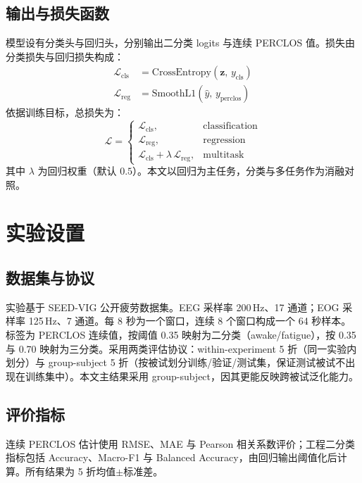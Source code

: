 \documentclass[11pt,a4paper]{ctexart}
\begin{document}
\subsection{输出与损失函数}
模型设有分类头与回归头，分别输出二分类 logits 与连续 PERCLOS 值。损失由分类损失与回归损失构成：
\begin{align}
\mathcal{L}_{\text{cls}} &= \mathrm{CrossEntropy}(\mathbf{z},\,y_{\text{cls}}) \label{eq:lcls}\\
\mathcal{L}_{\text{reg}} &= \mathrm{SmoothL1}(\hat{y},\,y_{\text{perclos}}) \label{eq:lreg}
\end{align}
依据训练目标，总损失为：
\begin{equation}
\mathcal{L} = \begin{cases}
\mathcal{L}_{\text{cls}}, & \text{classification} \\[2pt]
\mathcal{L}_{\text{reg}}, & \text{regression} \\[2pt]
\mathcal{L}_{\text{cls}} + \lambda\,\mathcal{L}_{\text{reg}}, & \text{multitask}
\end{cases}
\label{eq:loss}
\end{equation}
其中 $\lambda$ 为回归权重（默认 $0.5$）。本文以回归为主任务，分类与多任务作为消融对照。

\section{实验设置}

\subsection{数据集与协议}
实验基于 SEED-VIG 公开疲劳数据集。EEG 采样率 200\,Hz、17 通道；EOG 采样率 125\,Hz、7 通道。每 8 秒为一个窗口，连续 8 个窗口构成一个 64 秒样本。标签为 PERCLOS 连续值，按阈值 0.35 映射为二分类（awake/fatigue），按 0.35 与 0.70 映射为三分类。采用两类评估协议：within-experiment 5 折（同一实验内划分）与 group-subject 5 折（按被试划分训练/验证/测试集，保证测试被试不出现在训练集中）。本文主结果采用 group-subject，因其更能反映跨被试泛化能力。

\subsection{评价指标}
连续 PERCLOS 估计使用 RMSE、MAE 与 Pearson 相关系数评价；工程二分类指标包括 Accuracy、Macro-F1 与 Balanced Accuracy，由回归输出阈值化后计算。所有结果为 5 折均值$\pm$标准差。
\end{document}
